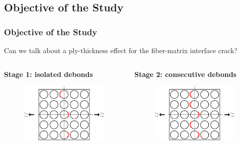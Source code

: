 \documentclass[first,firstsupp,lastsupp,last,hyperref,table]{ETHclass}
\begin{document}
\subsection{Objective of the Study}

\begin{frame}
\frametitle{\vspace{0.2cm}\small Objective of the Study}
\vspace{-0.5cm}
Can we talk about a ply-thickness effect for the fiber-matrix interface crack?
\centering
\begin{columns}
\begin{column}{0.5\textwidth}
\begin{alertblock}{\centering\scriptsize\bf Stage 1: isolated debonds}
\vspace{-0.25cm}
\begin{figure}
\centering
\includegraphics[width=\columnwidth]{stage1-isolateddebonds.pdf}
\end{figure}
\end{alertblock}
\end{column}
\begin{column}{0.5\textwidth}
\begin{alertblock}{\centering\scriptsize\bf Stage 2: consecutive debonds}
\vspace{-0.25cm}
\begin{figure}
\centering
\includegraphics[width=\columnwidth]{stage2-critdebonds.pdf}

\end{figure}
\end{alertblock}
\end{column}
\end{columns}
\end{frame}
\end{document}
